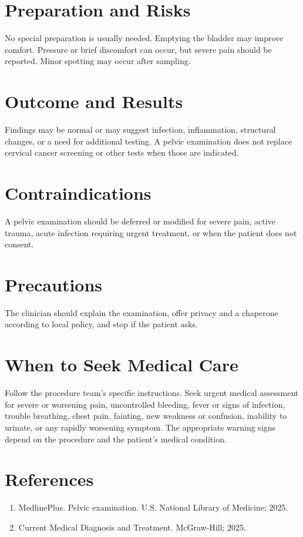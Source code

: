 \section*{Preparation and Risks}
No special preparation is usually needed. Emptying the bladder may improve comfort. Pressure or brief discomfort can occur, but severe pain should be reported. Minor spotting may occur after sampling.

\section*{Outcome and Results}
Findings may be normal or may suggest infection, inflammation, structural changes, or a need for additional testing. A pelvic examination does not replace cervical cancer screening or other tests when those are indicated.

\section*{Contraindications}
A pelvic examination should be deferred or modified for severe pain, active trauma, acute infection requiring urgent treatment, or when the patient does not consent.

\section*{Precautions}
The clinician should explain the examination, offer privacy and a chaperone according to local policy, and stop if the patient asks.

\section*{When to Seek Medical Care}
Follow the procedure team's specific instructions. Seek urgent medical assessment for severe or worsening pain, uncontrolled bleeding, fever or signs of infection, trouble breathing, chest pain, fainting, new weakness or confusion, inability to urinate, or any rapidly worsening symptom. The appropriate warning signs depend on the procedure and the patient's medical condition.

\section*{References}
\begin{enumerate}
  \item MedlinePlus. Pelvic examination. U.S. National Library of Medicine; 2025.
  \item Current Medical Diagnosis and Treatment. McGraw-Hill; 2025.
\end{enumerate}
\clearpage
